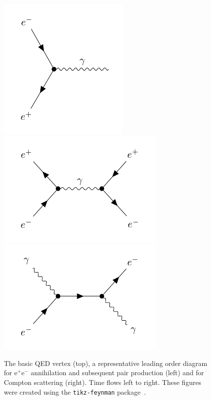 \begin{figure}
\begin{centering}
\includegraphics{figures/theory/feyn/qed1.pdf}\\
\includegraphics{figures/theory/feyn/qed2.pdf}
\includegraphics{figures/theory/feyn/qed3.pdf}
\caption{The basic QED vertex (top), a representative leading order diagram for $\mathrm{e}^+ \mathrm{e}^-$ annihilation and subsequent pair production (left) and for Compton scattering (right). Time flows left to right. These figures were created using the \texttt{tikz-feynman} package~\cite{Ellis:2016jkw}.}
\label{fig:theory_qed}
\end{centering}
\end{figure}

